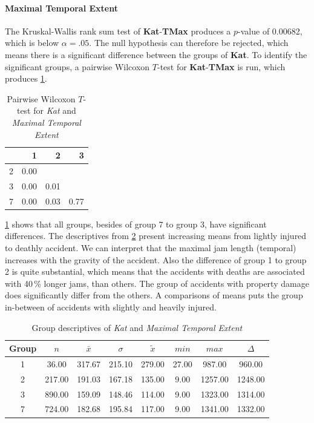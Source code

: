 \paragraph{Maximal Temporal Extent}
The Kruskal-Wallis rank sum test of \textbf{Kat}-\textbf{TMax} produces a $p$-value of 0.00682, which is below $\alpha=.05$. The null hypothesis can therefore be rejected, which means there is a significant difference between the groups of \textbf{Kat}. To identify the significant groups, a pairwise Wilcoxon $T$-test for \textbf{Kat}-\textbf{TMax} is run, which produces \cref{tbl:wilcoxon_baysis_matched_Kat_TMax}.
\begin{table}[ht]
	\small
	\centering
	\begin{tabular}{rrrr}
	  	\toprule
	 	& 1 & 2 & 3 \\ 
	  	\midrule
		2 & 0.00 &  &  \\ 
	  	3 & 0.00 & 0.01 &  \\ 
	  	7 & 0.00 & 0.03 & 0.77 \\ 
	   	\bottomrule
	\end{tabular}
	\caption{Pairwise Wilcoxon $T$-test for \textit{Kat} and \textit{Maximal Temporal Extent}}
	\label{tbl:wilcoxon_baysis_matched_Kat_TMax}
\end{table}
\cref{tbl:wilcoxon_baysis_matched_Kat_TMax} shows that all groups, besides of group 7 to group 3, have significant differences. The descriptives from \cref{tbl:descriptives_baysis_matched_Kat_TMax} present increasing means from lightly injured to deathly accident. We can interpret that the maximal jam length (temporal) increases with the gravity of the accident. Also the difference of group 1 to group 2 is quite substantial, which means that the accidents with deaths are associated with 40\,\% longer jams, than others. The group of accidents with property damage does significantly differ from the others. A comparisons of means puts the group in-between of accidents with slightly and heavily injured.
\begin{table}[ht]
	\small
	\centering
	\begin{tabular}{c|c|c|c|c|c|c|c}
		\toprule
		Group & $n$ & $\bar{x}$ & $\sigma$ & $\tilde{x}$ & $min$ & $max$ & $\Delta$ \\   
	  	\midrule
		1 & 36.00 & 317.67 & 215.10 & 279.00   & 27.00 & 987.00 & 960.00  \\ 
	  	2 & 217.00 & 191.03 & 167.18 & 135.00 & 9.00 & 1257.00 & 1248.00  \\ 
	  	3 & 890.00 & 159.09 & 148.46 & 114.00 & 9.00 & 1323.00 & 1314.00  \\ 
	  	7 & 724.00 & 182.68 & 195.84 & 117.00  & 9.00 & 1341.00 & 1332.00 \\ 
	   	\bottomrule
	\end{tabular}
	\caption{Group descriptives of \textit{Kat} and \textit{Maximal Temporal Extent}}
	\label{tbl:descriptives_baysis_matched_Kat_TMax}
\end{table}

